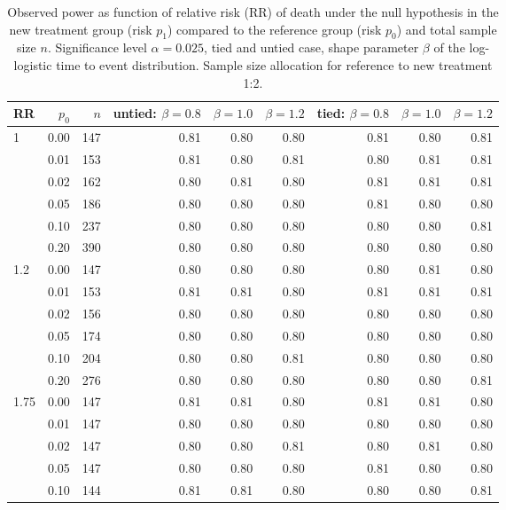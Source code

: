 \documentclass[bimj,fleqn]{w-art}\usepackage[]{graphicx}\usepackage[]{color}
\theoremstyle{plain}
\theoremstyle{definition}
\begin{document}
\begin{table}[ht]
\centering
\caption{Observed power as function of relative risk
             (RR) of death under the null hypothesis in the new treatment group
             (risk $p_1$) compared to the reference group (risk $p_0$) and total
             sample size $n$.
             Significance level $\alpha =0.025$, tied and untied case,
             shape parameter $\beta$ of the log-logistic time to event
             distribution. Sample size allocation for reference to new treatment 1:2. } 
\label{tab:simresult}
\begin{tabular}{lrrrrrrrr}
  \hline
RR & $p_0$ & $n$ & untied: $\beta = 0.8$ & $\beta = 1.0$ & $\beta = 1.2$ & tied: $\beta = 0.8$ & $\beta = 1.0$ & $\beta = 1.2$ \\ 
  \hline
1 & 0.00 & 147 & 0.81 & 0.80 & 0.80 & 0.81 & 0.80 & 0.81 \\ 
    & 0.01 & 153 & 0.81 & 0.80 & 0.81 & 0.80 & 0.81 & 0.81 \\ 
    & 0.02 & 162 & 0.80 & 0.81 & 0.80 & 0.81 & 0.81 & 0.81 \\ 
    & 0.05 & 186 & 0.80 & 0.80 & 0.80 & 0.81 & 0.80 & 0.80 \\ 
    & 0.10 & 237 & 0.80 & 0.80 & 0.80 & 0.80 & 0.80 & 0.81 \\ 
    & 0.20 & 390 & 0.80 & 0.80 & 0.80 & 0.80 & 0.80 & 0.80 \\ 
  1.2 & 0.00 & 147 & 0.80 & 0.80 & 0.80 & 0.80 & 0.81 & 0.80 \\ 
    & 0.01 & 153 & 0.81 & 0.81 & 0.80 & 0.81 & 0.81 & 0.81 \\ 
    & 0.02 & 156 & 0.80 & 0.80 & 0.80 & 0.80 & 0.80 & 0.80 \\ 
    & 0.05 & 174 & 0.80 & 0.80 & 0.80 & 0.80 & 0.80 & 0.80 \\ 
    & 0.10 & 204 & 0.80 & 0.80 & 0.81 & 0.80 & 0.80 & 0.80 \\ 
    & 0.20 & 276 & 0.80 & 0.80 & 0.80 & 0.80 & 0.80 & 0.81 \\ 
  1.75 & 0.00 & 147 & 0.81 & 0.81 & 0.80 & 0.81 & 0.81 & 0.80 \\ 
    & 0.01 & 147 & 0.80 & 0.80 & 0.80 & 0.80 & 0.80 & 0.80 \\ 
    & 0.02 & 147 & 0.80 & 0.80 & 0.81 & 0.80 & 0.81 & 0.80 \\ 
    & 0.05 & 147 & 0.80 & 0.80 & 0.80 & 0.81 & 0.80 & 0.80 \\ 
    & 0.10 & 144 & 0.81 & 0.81 & 0.80 & 0.80 & 0.80 & 0.81 \\ 

\end{tabular}
\end{table}
\end{document}
